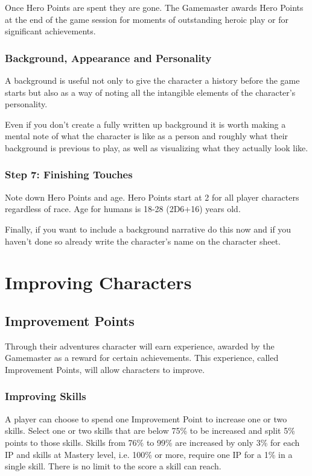 Once Hero Points are spent they are gone. The Gamemaster awards Hero Points at the end of the game session for moments of outstanding heroic play or for significant achievements.

\subsubsection{Background, Appearance and Personality}
A background is useful not only to give the character a history before the game starts but also as a way of noting all the intangible elements of the character’s personality. 

Even if you don’t create a fully written up background it is worth making a mental note of what the character is like as a person and roughly what their background is previous to play, as well as visualizing what they actually look like. 

\subsubsection{Step 7: Finishing Touches}
Note down Hero Points and age. Hero Points start at 2 for all player characters regardless of race. Age for humans is 18-28 (2D6+16) years old.

Finally, if you want to include a background narrative do this now and if you haven’t done so already write the character’s name on the character sheet.


\section{Improving Characters}

\subsection{Improvement Points}
\label{ssec:improvement-points}
Through their adventures character will earn experience, awarded by the Gamemaster as a reward for certain achievements. This experience, called Improvement Points, will allow characters to improve.

\subsubsection{Improving Skills}
A player can choose to spend one Improvement Point to increase one or two skills.
Select one or two skills that are below 75\% to be increased and split 5\% points to those skills. Skills from 76\% to 99\% are increased by only 3\% for each IP and skills at Mastery level, i.e. 100\% or more, require one IP for a 1\% in a single skill.
There is no limit to the score a skill can reach. 

